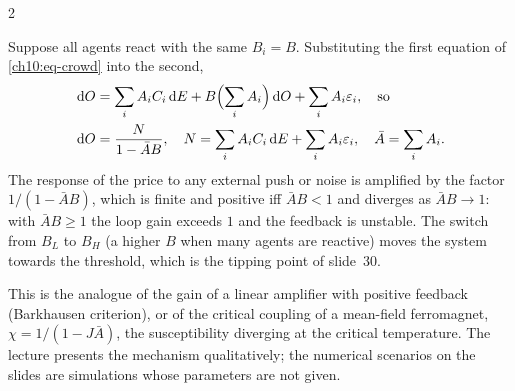 \begin{paracol}{2}
\begin{proposition}\label{ch10:prop-tipping}
Suppose all agents react with the same $B_i=B$. Substituting the first equation of \eqref{ch10:eq-crowd} into the second,
\begin{align*}
  \,\mathrm{d} O&=\sum_iA_iC_i\,\mathrm{d} E+B\Bigl(\sum_iA_i\Bigr)\,\mathrm{d} O+\sum_iA_i\varepsilon_i,\quad\text{so}\\
  \,\mathrm{d} O&=\frac{N}{1-\bar A B},\quad N=\sum_iA_iC_i\,\mathrm{d} E+\sum_iA_i\varepsilon_i,\quad \bar A=\sum_iA_i .
\end{align*}
The response of the price to any external push or noise is amplified by the factor $1/(1-\bar AB)$, which is finite
and positive iff $\bar AB<1$ and diverges as $\bar AB\to1$: with $\bar A B\ge1$ the loop gain exceeds $1$ and the
feedback is unstable. The switch from $B_L$ to $B_H$ (a higher $B$ when many agents are reactive) moves the system
towards the threshold, which is the tipping point of slide~30.
\end{proposition}
\noindent This is the analogue of the gain of a linear amplifier with positive feedback (Barkhausen criterion), or of the
critical coupling of a mean-field ferromagnet, $\chi=1/(1-J\bar A)$, the susceptibility diverging at the critical
temperature. The lecture presents the mechanism qualitatively; the numerical scenarios on the slides are simulations
whose parameters are not given.


\end{paracol}
